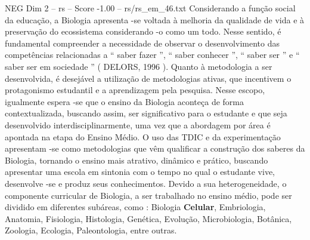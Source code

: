 \begin{textsample}{NEG Dim 2 – rs – Score -1.00 – rs/rs\_em\_46.txt}
Considerando a função social da educação, a Biologia apresenta -se voltada à melhoria da qualidade de vida e à preservação do ecossistema considerando -o como um todo.
Nesse sentido, é fundamental compreender a necessidade de observar o desenvolvimento das competências relacionadas a “ saber fazer ”, “ saber conhecer ”, “ saber ser ” e “ saber ser em sociedade ” ( DELORS, 1996 ).
Quanto à metodologia a ser desenvolvida, é desejável a utilização de metodologias ativas, que incentivem o protagonismo estudantil e a aprendizagem pela pesquisa.
Nesse escopo, igualmente espera -se que o ensino da Biologia aconteça de forma contextualizada, buscando assim, ser significativo para o estudante e que seja desenvolvido interdisciplinarmente, uma vez que a abordagem por área é apontada na etapa do Ensino Médio.
O uso das TDIC e da experimentação apresentam -se como metodologias que vêm qualificar a construção dos saberes da Biologia, tornando o ensino mais atrativo, dinâmico e prático, buscando apresentar uma escola em sintonia com o tempo no qual o estudante vive, desenvolve -se e produz seus conhecimentos.
Devido a sua heterogeneidade, o componente curricular de Biologia, a ser trabalhado no ensino médio, pode ser dividido em diferentes subáreas, como : Biologia \textbf{Celular}, Embriologia, Anatomia, Fisiologia, Histologia, Genética, Evolução, Microbiologia, Botânica, Zoologia, Ecologia, Paleontologia, entre outras.

\end{textsample}
